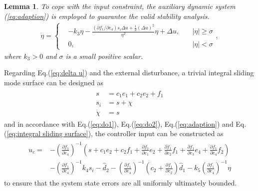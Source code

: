 \documentclass[ShortAfour]{sage}
\theoremstyle{plain}
\newtheorem{mylem}{Lemma}
\theoremstyle{remark}
\begin{document}
\begin{mylem}\cite{Chen2011}\label{lem: adaptive input}
  To cope with the input constraint, the auxiliary dynamic system (\ref{eq:adaption}) is employed to guarantee the valid stability analysis.
  \begin{align} \dot\eta=\left\{
  \begin{aligned}
  &-k_3\eta-\frac{(\partial f_1/\partial e_4)s_i\Delta u+\frac{1}{2}(\Delta u)^2}{\eta^2}\eta+\Delta u,\quad&\vert\eta\vert\ge\sigma \\
  &0,\quad&\vert\eta\vert<\sigma \end{aligned}
  \right.,\label{eq:adaption}
  \end{align}
where $k_3>0$ and $\sigma$ is a small positive scalar.
\end{mylem}


Regarding Eq.(\ref{eq:delta u}) and the external disturbance, a trivial integral sliding mode surface can be designed as
\begin{align}\begin{split}
  s&=c_1e_1+c_2e_2+f_1\\
  s_i&=s+\chi\\
  \dot\chi&=s\label{eq:integral sliding surface}
\end{split}\end{align}
and in accordance with Eq.(\ref{eq:do1}), Eq.(\ref{eq:do2}), Eq.(\ref{eq:adaption}) and Eq.(\ref{eq:integral sliding surface}), the controller input can be constructed as
\begin{align}\begin{split}
  u_c =& -\left(\frac{\partial f_1}{\partial e_4}\right)^{-1}\left(s+c_1e_2+c_2f_1+\frac{\partial f_1}{\partial e_1}e_2+\frac{\partial f_1}{\partial e_2}f_1+\frac{\partial f_1}{\partial e_3}e_4+\frac{\partial f_1}{\partial e_4}f_2\right)\\
  &-\left(\frac{\partial f_1}{\partial e_4}\right)^{-1}k_4s_i-\hat d_2-\left(\frac{\partial f_1}{\partial e_4}\right)^{-1}\left(c_2+\frac{\partial f_1}{\partial e_2}\right)\hat d_1-k_5\left(\frac{\partial f_1}{\partial e_4}\right)^{-1}\eta\label{eq:uc}
\end{split}\end{align}
to ensure that the system state errors are all uniformly ultimately bounded.
\end{document}
